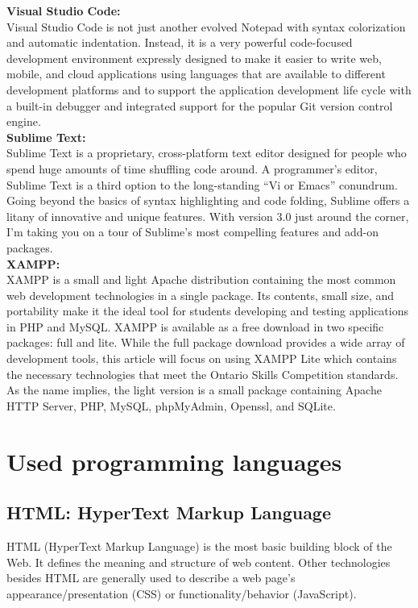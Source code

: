 \textbf{\noindent	Visual Studio Code:\\}
\indent Visual Studio Code is not just another evolved Notepad with syntax colorization and automatic indentation. Instead, it is a very powerful code-focused development
 environment expressly designed to make it easier to write web, mobile, and cloud applications using languages that are available to different development platforms and
  to support the application development life cycle with a built-in debugger and integrated support for the popular Git version control engine.\cite{Del_Sole2021-cv}\\

\textbf{\noindent Sublime Text:\\}
\indent Sublime Text is a proprietary, cross-platform text editor designed for people who spend huge amounts of time shuffling code around. A programmer's editor,
 Sublime Text is a third option to the long-standing “Vi or Emacs” conundrum. Going beyond the basics of syntax highlighting and code folding, Sublime offers a 
 litany of innovative and unique features. With version 3.0 just around the corner, I'm taking you on a tour of Sublime's most compelling features and add-on packages.\cite{kinder2013sublime}\\


 \textbf{\noindent XAMPP:\\}
 \indent XAMPP is a small and light Apache distribution containing the most common web development
 technologies in a single package. Its contents, small size, and portability make it the ideal tool for
 students developing and testing applications in PHP and MySQL. XAMPP is available as a free
 download in two specific packages: full and lite. While the full package download provides a wide
 array of development tools, this article will focus on using XAMPP Lite which contains the necessary
 technologies that meet the Ontario Skills Competition standards. As the name implies, the light version
 is a small package containing Apache HTTP Server, PHP, MySQL, phpMyAdmin, Openssl, and
 SQLite.\cite{dvorski2007installing}\\






\section{Used programming languages}


\subsection{HTML: HyperText Markup Language}
HTML (HyperText Markup Language) is the most basic building block of the Web. It defines the meaning and structure of web content. Other technologies besides HTML are generally used to describe a web page's appearance/presentation (CSS) or functionality/behavior (JavaScript).\cite{MDN-HTML}\\


